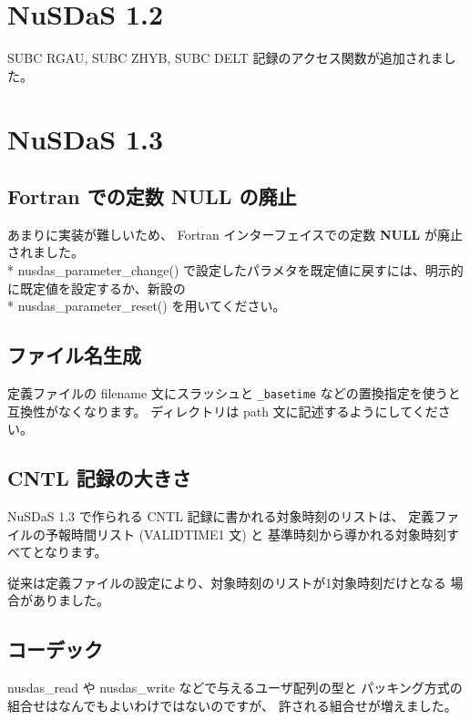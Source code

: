
\section{NuSDaS 1.2}

SUBC RGAU, SUBC ZHYB, SUBC DELT 記録のアクセス関数が追加されました。

\section{NuSDaS 1.3}
\label{changes13}

\subsection{Fortran での定数 NULL の廃止}

あまりに実装が難しいため、
Fortran インターフェイスでの定数 {\bf NULL} が廃止されました。
\\* nusdas\_parameter\_change()
で設定したパラメタを既定値に戻すには、明示的に既定値を設定するか、新設の
\\* nusdas\_parameter\_reset()
を用いてください。

\subsection{ファイル名生成}

定義ファイルの filename 文にスラッシュと
{\tt \_basetime} などの置換指定を使うと互換性がなくなります。
ディレクトリは path 文に記述するようにしてください。

\subsection{CNTL 記録の大きさ}

NuSDaS 1.3 で作られる CNTL 記録に書かれる対象時刻のリストは、
定義ファイルの予報時間リスト (VALIDTIME1 文) と
基準時刻から導かれる対象時刻すべてとなります。

従来は定義ファイルの設定により、対象時刻のリストが1対象時刻だけとなる
場合がありました。

\subsection{コーデック}\label{chgs-codec}

nusdas\_read や nusdas\_write などで与えるユーザ配列の型と
パッキング方式の組合せはなんでもよいわけではないのですが、
許される組合せが増えました。


